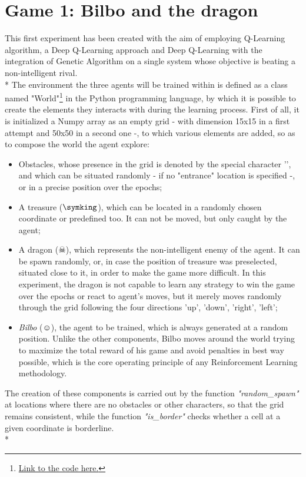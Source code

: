 \section{Game 1: Bilbo and the dragon}
This first experiment has been created with the aim of employing Q-Learning algorithm, a Deep Q-Learning approach and Deep Q-Learning with the integration of Genetic Algorithm on a single system whose objective is beating a non-intelligent rival.\\*
The environment the three agents will be trained within is defined as a class named "World"\footnote{\href{https://github.com/moiraghif/DragonHunting/blob/master/Bilbo\%20World/CreateBilboWorld.py}{Link to the code here.}} in the Python programming language, by which it is possible to create the elements they interacts with during the learning process. First of all, it is initialized a Numpy array as an empty grid - with dimension 15x15 in a first attempt and 50x50 in a second one -, to which various elements are added, so as to compose the world the agent explore:
\begin{itemize}
  \item Obstacles, whose presence in the grid is denoted by the special character '', and which can be situated randomly - if no "entrance" location is specified -, or in a precise position over the epochs;
  \item A treasure ($\symking$), which can be located in a randomly chosen coordinate or predefined too. It can not be moved, but only caught by the agent;
  \item A dragon ($\skull$), which represents the non-intelligent enemy of the agent. It can be spawn randomly, or, in case the position of treasure was preselected, situated close to it, in order to make the game more difficult. In this experiment, the dragon is not capable to learn any strategy to win the game over the epochs or react to agent's moves, but it merely moves randomly through the grid following the four directions 'up', 'down', 'right', 'left';
  \item \textit{Bilbo} ($\smiley$), the agent to be trained, which is always generated at a random position. Unlike the other components, Bilbo moves around the world trying to maximize the total reward of his game and avoid penalties in best way possible, which is the core operating principle of any Reinforcement Learning methodology.
\end{itemize}
The creation of these components is carried out by the function \textit{"random\_spawn"} at locations where there are no obstacles or other characters, so that the grid remains consistent, while the function \textit{"is\_border"} checks whether a cell at a given coordinate is borderline.\\*

